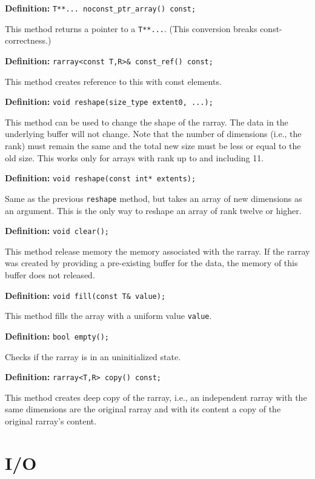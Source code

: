 \documentclass[11pt,twoside]{article}
\begin{document}
\noindent\textbf{Definition:} \texttt{T**... noconst\_ptr\_array() const;}

This method returns a pointer to a \texttt{T**...}. (This conversion breaks const-correctness.)


\noindent\textbf{Definition:} \texttt{rarray{\tt<}const T,R{\tt>}\& const\_ref() const;}

This method creates reference to this with const elements.

\noindent\textbf{Definition:} \texttt{void reshape(size\_type extent0, ...);}

This method can be used to change the shape of the rarray. The data in
the underlying buffer will not change. Note that the number of
dimensions (i.e., the rank) must remain the same and the total new size must be less or equal to the old size.  This works only for arrays with rank up to and including 11. 

\noindent\textbf{Definition:} \texttt{void reshape(const int* extents);}

Same as the previous \texttt{reshape} method, but takes an array of new dimensions as an argument.  This is the only way to reshape an array of rank twelve or higher.

\noindent\textbf{Definition:} \texttt{void clear();}

This method release memory the memory associated with the rarray. If the rarray was created by providing a pre-existing buffer for the data, the memory of this buffer does not released.

\noindent\textbf{Definition:} \texttt{void fill(const T\& value);}

This method fills the array with a uniform value \texttt{value}.

\noindent\textbf{Definition:} \texttt{bool empty();}

Checks if the rarray is in an uninitialized state.

\noindent\textbf{Definition:} \texttt{rarray{\tt<}T,R{\tt>} copy() const;}

This method creates deep copy of the rarray, i.e., an independent rarray with the same dimensions are the original rarray and with its content a copy of the original rarray's content.

\section{I/O}
\end{document}
